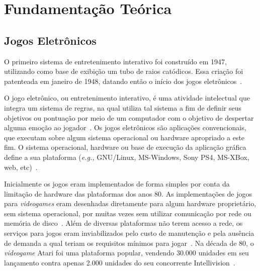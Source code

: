 \chapter{Fundamentação Teórica}
\label{cap2}



\section{Jogos Eletrônicos}



O primeiro sistema de entretenimento interativo foi construído em 1947, utilizando como base de exibição um tubo de raios catódicos.
%
Essa criação foi patenteada em janeiro de 1948, datando então o início dos jogos eletrônicos~\cite{Adams2014Jan, patents1947Jan}.



O jogo eletrônico, ou entretenimento interativo, é uma atividade intelectual que integra um sistema de regras, na qual utiliza tal sistema a fim de definir seus objetivos ou pontuação por meio de um computador com o objetivo de despertar alguma emoção ao jogador~\cite{video_game_technologies}.
%
Os jogos eletrônicos são aplicações convencionais, que executam sobre algum sistema operacional ou hardware apropriado a este fim.
%
O sistema operacional, hardware ou base de execução da aplicação gráfica define a sua plataforma (\textit{e.g.,} GNU/Linux, MS-Windows, Sony PS4, MS-XBox, web, etc)~\cite{adams_1208533}.



Inicialmente os jogos eram implementados de forma simples por conta da limitação de hardware das plataformas dos anos 80.
%
As implementações de jogos para \textit{videogames} eram desenhadas diretamente para algum hardware proprietário, sem sistema operacional, por muitas vezes sem utilizar comunicação por rede ou memória de disco~\cite{rollings2003andrew}.
%
Além de diversas plataformas não terem acesso a rede, os serviços para jogos eram inviabilizados pelo custo de manutenção e pela ausência de demanda a qual teriam os requisitos mínimos para jogar~\cite{adams_1208533}.
%
Na década de 80, o \textit{videogame} Atari foi uma plataforma popular, vendendo 30.000 unidades em seu lançamento contra apenas 2.000 unidades do seu concorrente Intellivision~\cite{atari_age}.



